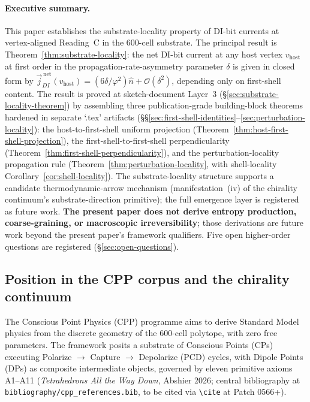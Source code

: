 \documentclass[11pt,letterpaper]{article}
\newcommand{\phig}{\varphi}
\newcommand{\vhost}{v_{\text{host}}}
\newcommand{\jDInet}{\vec{j}_{DI}^{\,\text{net}}}
\newcommand{\bigO}[1]{\mathcal{O}(#1)}
\begin{document}
\paragraph{Executive summary.}
This paper establishes the substrate-locality property of DI-bit currents at vertex-aligned Reading~C in the 600-cell substrate. The principal result is Theorem~\ref{thm:substrate-locality}: the net DI-bit current at any host vertex $\vhost$ at first order in the propagation-rate-asymmetry parameter $\delta$ is given in closed form by $\jDInet(\vhost) = (6\delta/\phig^2)\hat{n} + \bigO{\delta^2}$, depending only on first-shell content. The result is proved at sketch-document Layer~3 (\S\ref{sec:substrate-locality-theorem}) by assembling three publication-grade building-block theorems hardened in separate `.tex' artifacts (\S\S\ref{sec:first-shell-identities}--\ref{sec:perturbation-locality}): the host-to-first-shell uniform projection (Theorem~\ref{thm:host-first-shell-projection}), the first-shell-to-first-shell perpendicularity (Theorem~\ref{thm:first-shell-perpendicularity}), and the perturbation-locality propagation rule (Theorem~\ref{thm:perturbation-locality}, with shell-locality Corollary~\ref{cor:shell-locality}). The substrate-locality structure supports a candidate thermodynamic-arrow mechanism (manifestation~(iv) of the chirality continuum's substrate-direction primitive); the full emergence layer is registered as future work. \textbf{The present paper does not derive entropy production, coarse-graining, or macroscopic irreversibility}; those derivations are future work beyond the present paper's framework qualifiers. Five open higher-order questions are registered (\S\ref{sec:open-questions}).

\subsection{Position in the CPP corpus and the chirality continuum}
\label{sec:position-in-cpp}

The Conscious Point Physics (CPP) programme aims to derive Standard Model physics from the discrete geometry of the 600-cell polytope, with zero free parameters. The framework posits a substrate of Conscious Points (CPs) executing Polarize $\to$ Capture $\to$ Depolarize (PCD) cycles, with Dipole Points (DPs) as composite intermediate objects, governed by eleven primitive axioms A1--A11 (\textit{Tetrahedrons All the Way Down}, Abshier 2026; central bibliography at \texttt{bibliography/cpp\_references.bib}, to be cited via \texttt{\textbackslash cite} at Patch 0566+).
\end{document}
